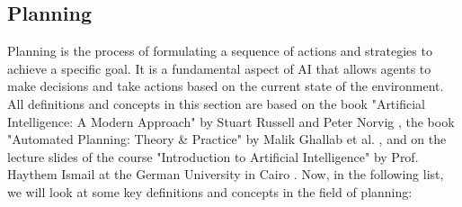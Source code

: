 \subsection{Planning}
Planning is the process of formulating a sequence of actions and strategies to achieve a specific goal.
It is a fundamental aspect of \ac{AI} that allows agents to make decisions and take actions based on the current state of the environment. All definitions and concepts in this section are based on the book "Artificial Intelligence: A Modern Approach" by Stuart Russell and Peter Norvig \cite{RN2020}, the book "Automated Planning: Theory \& Practice" by Malik Ghallab et al. \cite{10.5555/975615}, and on the lecture slides of the course "Introduction to Artificial Intelligence" by Prof. Haythem Ismail at the German University in Cairo \cite{Ismail2023}.
Now, in the following list, we will look at some key definitions and concepts in the field of planning:
